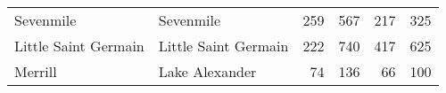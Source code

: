 \begin{table}[h!]
\begin{tabular}{llrrrr}
		Sevenmile                  & Sevenmile                     & 259                                  & 567                                  & 217                        & 325                        \\
		Little Saint Germain       & Little Saint Germain          & 222                                  & 740                                  & 417                        & 625                        \\
		Merrill                    & Lake Alexander                & 74                                   & 136                                  & 66                         & 100                        \\
\hline
	\end{tabular}
	\label{table:res_table}
\end{table}	